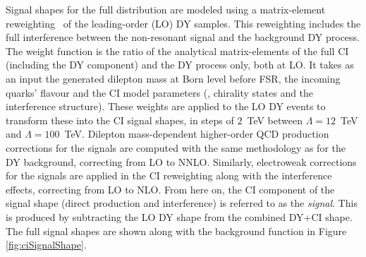 Signal shapes for the full \mll distribution are modeled using a matrix-element reweighting~\cite{EXOT-2016-05} of the leading-order (LO) DY samples.
This reweighting includes the full interference between the non-resonant signal and the background DY process.
The weight function is the ratio of the analytical matrix-elements of the full CI (including the DY component) and the DY process only, both at LO.
It takes as an input the generated dilepton mass at Born level before FSR, the incoming quarks' flavour and the CI model parameters (\lam, chirality states and the interference structure).
These weights are applied to the LO DY events to transform these into the CI signal shapes, in steps of $2$~TeV between $\Lambda=12$~TeV and $\Lambda=100$~TeV.
Dilepton mass-dependent higher-order QCD production corrections for the signals are computed with the same methodology as for the DY background, correcting from LO to NNLO.
Similarly, electroweak corrections for the signals are applied in the CI reweighting along with the interference effects, correcting from LO to NLO.
From here on, the CI component of the signal shape (direct production and interference) is referred to as the \emph{signal}. This is produced by subtracting the LO DY shape from the combined DY+CI shape.
The full \mll signal shapes are shown along with the background function in Figure \ref{fig:ciSignalShape}.

